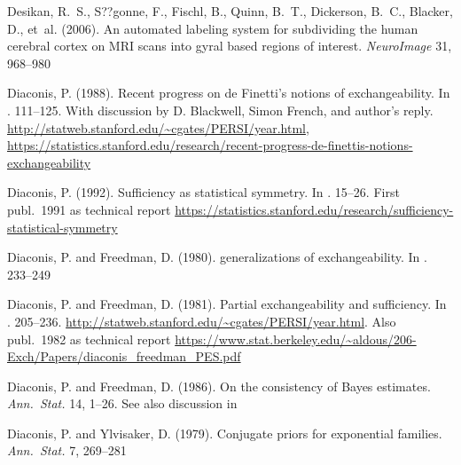 \documentclass[%
]{frontiersSCNS-nologo} %
\newcommand*{\citein}[2][]{\textnormal{\citet[#1]{#2}}%
}
\newcommand*{\citebi}[2][]{\citet[#1]{#2}%
}
\renewcommand*{\|}{\mathpunct{|}}%
\begin{document}
\begin{thebibliography}{156}
Desikan, R.~S., S??gonne, F., Fischl, B., Quinn, B.~T., Dickerson, B.~C.,
  Blacker, D., et~al. (2006).
\newblock An automated labeling system for subdividing the human cerebral
  cortex on {MRI} scans into gyral based regions of interest.
\newblock \emph{NeuroImage} 31, 968--980

Diaconis, P. (1988).
\newblock Recent progress on {de Finetti's} notions of exchangeability.
\newblock In \emph{\citein{bernardoetal1988c}}. 111--125.
\newblock With discussion by D. Blackwell, Simon French, and author's reply.
  \url{http://statweb.stanford.edu/~cgates/PERSI/year.html},
  \url{https://statistics.stanford.edu/research/recent-progress-de-finettis-notions-exchangeability}

Diaconis, P. (1992).
\newblock Sufficiency as statistical symmetry.
\newblock In \emph{\citein{browder1992}}. 15--26.
\newblock First publ.\ 1991 as technical report
  \url{https://statistics.stanford.edu/research/sufficiency-statistical-symmetry}

Diaconis, P. and Freedman, D. (1980).
 generalizations of exchangeability.
\newblock In \emph{\citein{jeffrey1980}}. 233--249

Diaconis, P. and Freedman, D. (1981).
\newblock Partial exchangeability and sufficiency.
\newblock In \emph{\citein{ghoshetal1981}}. 205--236.
\newblock \url{http://statweb.stanford.edu/~cgates/PERSI/year.html}. Also
  publ.\ 1982 as technical report
  \url{https://www.stat.berkeley.edu/~aldous/206-Exch/Papers/diaconis_freedman_PES.pdf}

Diaconis, P. and Freedman, D. (1986).
\newblock On the consistency of {Bayes} estimates.
\newblock \emph{Ann.\ Stat.} 14, 1--26.
\newblock See also discussion in \citebi{barronetal1986}

Diaconis, P. and Ylvisaker, D. (1979).
\newblock Conjugate priors for exponential families.
\newblock \emph{Ann.\ Stat.} 7, 269--281


\end{thebibliography}
\end{document}
